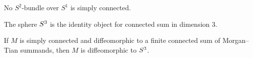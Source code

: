 \begin{theorem}
  \label{thm:s2-bundle-not-simply-connected}
  \notready
  No $S^2$-bundle over $S^1$ is simply connected.
\end{theorem}

\begin{theorem}
  \label{thm:connected-sum-sphere-identity}
  The sphere $S^3$ is the identity object for connected sum in dimension 3.
\end{theorem}

\begin{theorem}
  \label{thm:simply-connected-endgame}
  \notready
  If $M$ is simply connected and diffeomorphic to a finite connected sum of
  Morgan--Tian summands, then $M$ is diffeomorphic to $S^3$.
\end{theorem}
